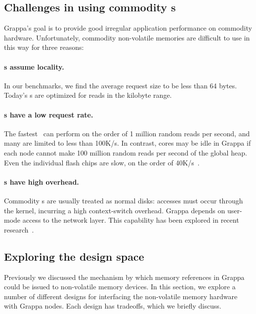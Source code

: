 \subsection{Challenges in using commodity s}
Grappa's goal is to provide good irregular application performance on
commodity hardware. Unfortunately, commodity non-volatile memories are
difficult to use in this way for three reasons:

\paragraph{s assume locality.} In our benchmarks, we find the average request size to be
less than 64 bytes. Today's s are optimized for reads in the
kilobyte range.  

\paragraph{s have a low request rate.} The fastest~\cite{fusionio} can
perform on the order of 1 million random reads per second, and many
are limited to less than 100K/s. In contrast, cores may be idle in
Grappa if each node cannot make 100 million random reads per second of
the global heap. Even the individual flash chips are slow, on the order of 40K/s~\cite{micronFlash}.

\paragraph{s have high overhead.} Commodity s are usually treated
as normal disks: accesses must occur through the kernel, incurring a
high context-switch overhead. Grappa depends on user-mode access to
the network layer. This capability has been explored in recent research~\cite{caulfield:2012}.

\subsection{Exploring the design space}

Previously we discussed the mechanism by which memory references in
Grappa could be issued to non-volatile memory devices. In this
section, we explore a number of different designs for interfacing the
non-volatile memory hardware with Grappa nodes. Each design has
tradeoffs, which we briefly discuss.

